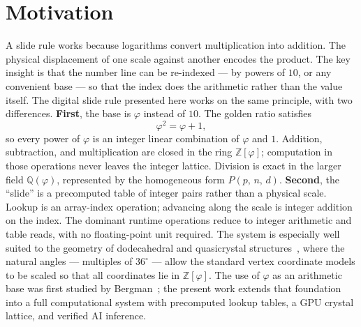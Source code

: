 \documentclass[12pt]{article}
\theoremstyle{definition}
\theoremstyle{remark}
\newcommand{\Zphi}{\mathbb{Z}[\varphi]}
\newcommand{\Qphi}{\mathbb{Q}(\varphi)}
\newcommand{\Phibd}[3]{P(#1,\,#2,\,#3)}
\begin{document}
\section{Motivation}
A slide rule works because logarithms convert multiplication into
addition.  The physical displacement of one scale against another
encodes the product.  The key insight is that the number line can be
re-indexed --- by powers of $10$, or any convenient base --- so that
the index does the arithmetic rather than the value itself.
The digital slide rule presented here works on the same principle,
with two differences.
\medskip
\noindent\textbf{First}, the base is $\varphi$ instead of $10$.
The golden ratio satisfies
\[
  \varphi^{2} = \varphi + 1,
\]
so every power of $\varphi$ is an integer linear combination of
$\varphi$ and $1$.  Addition, subtraction, and multiplication are
closed in the ring $\Zphi$; computation in those operations never
leaves the integer lattice.  Division is exact in the larger field
$\Qphi$, represented by the homogeneous form $\Phibd{p}{n}{d}$.
\medskip
\noindent\textbf{Second}, the ``slide'' is a precomputed table of
integer pairs rather than a physical scale.  Lookup is an array-index
operation; advancing along the scale is integer addition on the index.
The dominant runtime operations reduce to integer arithmetic and table
reads, with no floating-point unit required.
The system is especially well suited to the geometry of dodecahedral
and quasicrystal structures~\cite{shechtman,levine}, where the natural
angles --- multiples of $36^\circ$ --- allow the standard vertex
coordinate models to be scaled so that all coordinates lie in $\Zphi$.
The use of $\varphi$ as an arithmetic base was first studied by
Bergman~\cite{bergman}; the present work extends that foundation into a
full computational system with precomputed lookup tables, a GPU crystal
lattice, and verified AI inference.
\end{document}
